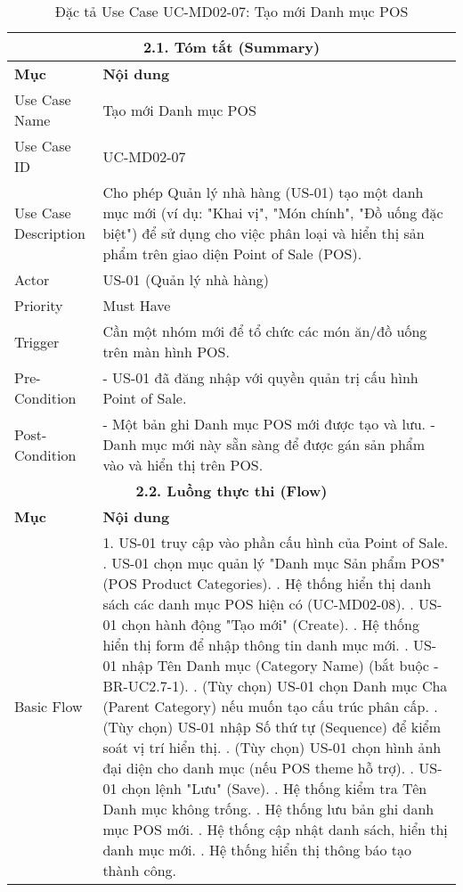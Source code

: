 \begin{longtable}{|m{4cm}|p{11cm}|}
\caption{Đặc tả Use Case UC-MD02-07: Tạo mới Danh mục POS} \label{tab:uc_md02_07_revised} \\
\hline
\multicolumn{2}{|c|}{\textbf{2.1. Tóm tắt (Summary)}} \\
\hline
\textbf{Mục} & \textbf{Nội dung} \\
\hline
\endhead %
\hline
\endfoot %
\hline
\endlastfoot %
Use Case Name & Tạo mới Danh mục POS \\
\hline
Use Case ID & UC-MD02-07 \\
\hline
Use Case Description & Cho phép Quản lý nhà hàng (US-01) tạo một danh mục mới (ví dụ: "Khai vị", "Món chính", "Đồ uống đặc biệt") để sử dụng cho việc phân loại và hiển thị sản phẩm trên giao diện Point of Sale (POS). \\
\hline
Actor & US-01 (Quản lý nhà hàng) \\
\hline
Priority & Must Have \\
\hline
Trigger & Cần một nhóm mới để tổ chức các món ăn/đồ uống trên màn hình POS. \\
\hline
Pre-Condition & - US-01 đã đăng nhập với quyền quản trị cấu hình Point of Sale. \\
\hline
Post-Condition & - Một bản ghi Danh mục POS mới được tạo và lưu. \newline - Danh mục mới này sẵn sàng để được gán sản phẩm vào và hiển thị trên POS. \\
\hline
\multicolumn{2}{|c|}{\textbf{2.2. Luồng thực thi (Flow)}} \\
\hline
\textbf{Mục} & \textbf{Nội dung} \\
\hline
Basic Flow & 1. US-01 truy cập vào phần cấu hình của Point of Sale. \newline 2. US-01 chọn mục quản lý "Danh mục Sản phẩm POS" (POS Product Categories). \newline 3. Hệ thống hiển thị danh sách các danh mục POS hiện có (UC-MD02-08). \newline 4. US-01 chọn hành động "Tạo mới" (Create). \newline 5. Hệ thống hiển thị form để nhập thông tin danh mục mới. \newline 6. US-01 nhập Tên Danh mục (Category Name) (bắt buộc - BR-UC2.7-1). \newline 7. (Tùy chọn) US-01 chọn Danh mục Cha (Parent Category) nếu muốn tạo cấu trúc phân cấp. \newline 8. (Tùy chọn) US-01 nhập Số thứ tự (Sequence) để kiểm soát vị trí hiển thị. \newline 9. (Tùy chọn) US-01 chọn hình ảnh đại diện cho danh mục (nếu POS theme hỗ trợ). \newline 10. US-01 chọn lệnh "Lưu" (Save). \newline 11. Hệ thống kiểm tra Tên Danh mục không trống. \newline 12. Hệ thống lưu bản ghi danh mục POS mới. \newline 13. Hệ thống cập nhật danh sách, hiển thị danh mục mới. \newline 14. Hệ thống hiển thị thông báo tạo thành công. \\

\end{longtable}
